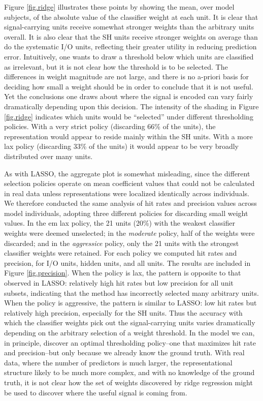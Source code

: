 Figure \ref{fig.ridge} illustrates these points by showing the mean, over model subjects, of the absolute value of the classifier weight at each unit. It is clear that signal-carrying units receive somewhat stronger weights than the arbitrary units overall. It is also clear that the SH units receive stronger weights on average than do the systematic I/O units, reflecting their greater utility in reducing prediction error. Intuitively, one wants to draw a threshold below which units are classified as irrelevant, but it is not clear how the threshold is to be selected. The differences in weight magnitude are not large, and there is no a-priori basis for deciding how small a weight should be in order to conclude that it is not useful. Yet the conclusions one draws about where the signal is encoded can vary fairly dramatically depending upon this decision. The intensity of the shading in Figure \ref{fig.ridge} indicates which units would be ``selected'' under different thresholding policies. With a very strict policy (discarding 66\% of the units), the representation would appear to reside mainly within the SH units. With a more lax policy (discarding 33\% of the units) it would appear to be very broadly distributed over many units.

As with LASSO, the aggregate plot is somewhat misleading, since the different selection policies operate on mean coefficient values that could not be calculated in real data unless representations were localized identically across individuals. We therefore conducted the same analysis of hit rates and precision values across model individuals, adopting three different policies for discarding small weight values. In the {em lax} policy, the 21 units (20\%) with the weakest classifier weights were deemed unselected; in the {\em moderate} policy, half of the weights were discarded; and in the {\em aggressice} policy, only the 21 units with the strongest classifier weights were retained. For each policy we computed hit rates and precision, for I/O units, hidden units, and all units. The results are included in Figure \ref{fig.precision}. When the policy is lax, the pattern is opposite to that observed in LASSO: relatively high hit rates but low precision for all unit subsets, indicating that the method has incorrectly selected many arbitrary units. When the policy is aggressive, the pattern is similar to LASSO: low hit rates but relatively high precision, especially for the SH units. Thus the accuracy with which the classifier weights pick out the signal-carrying units varies dramatically depending on the arbitrary selection of a weight threshold. In the model we can, in principle, discover an optimal thresholding policy--one that maximizes hit rate and precision--but only because we already know the ground truth. With real data, where the number of predictors is much larger, the representational structure likely to be much more complex, and with no knowledge of the ground truth, it is not clear how the set of weights discovered by ridge regression might be used to discover where the useful signal is coming from.  

